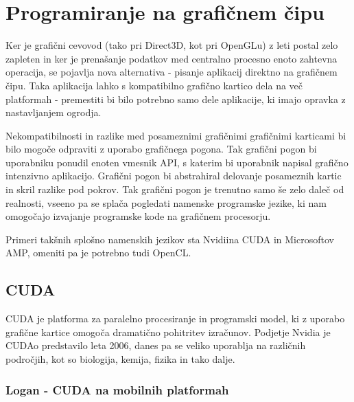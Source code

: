 \chapter{Programiranje na grafičnem čipu}


Ker je grafični cevovod (tako pri Direct3D, kot pri OpenGLu) z leti postal zelo zapleten in ker je prenašanje podatkov med centralno procesno enoto zahtevna operacija, se pojavlja nova alternativa - pisanje aplikacij direktno na grafičnem čipu. Taka aplikacija lahko s kompatibilno grafično kartico dela na več platformah - premestiti bi bilo potrebno samo dele aplikacije, ki imajo opravka z nastavljanjem ogrodja. 

Nekompatibilnosti in razlike med posameznimi grafičnimi grafičnimi karticami bi bilo mogoče odpraviti z uporabo grafičnega pogona. Tak grafični pogon bi uporabniku ponudil enoten vmesnik API, s katerim bi uporabnik napisal grafično intenzivno aplikacijo. Grafični pogon bi abstrahiral delovanje posameznih kartic in skril razlike pod pokrov. Tak grafični pogon je trenutno samo še zelo daleč od realnosti, vseeno pa se splača pogledati namenske programske jezike, ki nam omogočajo izvajanje programske kode na grafičnem procesorju.

Primeri takšnih splošno namenskih jezikov sta Nvidiina CUDA in Microsoftov AMP, omeniti pa je potrebno tudi OpenCL.

\section{CUDA}
CUDA \cite{cuda} je platforma za paralelno procesiranje in programski model, ki z uporabo grafične kartice omogoča dramatično pohitritev izračunov. Podjetje Nvidia je CUDAo predstavilo leta 2006, danes pa se veliko uporablja na različnih področjih, kot so biologija, kemija, fizika in tako dalje.

\subsection{Logan - CUDA na mobilnih platformah}


